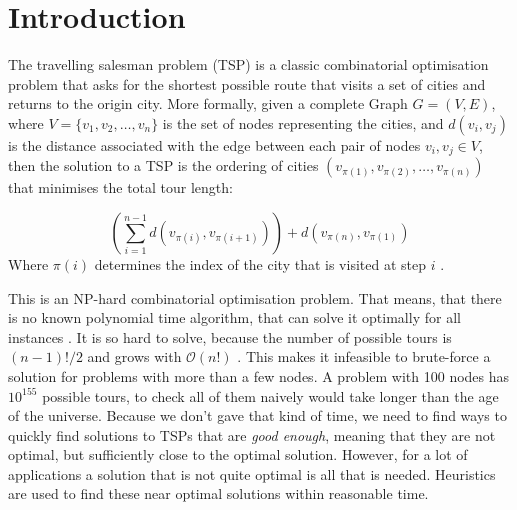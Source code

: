\section{Introduction}

The travelling salesman problem (TSP) is a classic combinatorial optimisation problem that asks for the shortest possible route that visits a set of cities and returns to the origin city.
More formally, given a complete Graph \( G=(V,E) \), where \( V = \{v_{1},v_{2},\ldots ,v_n\} \) is the set of nodes representing the cities,
and \( d(v_i,v_j) \) is the distance associated with the edge between each pair of nodes \( v_i,v_j \in V \), then
the solution to a TSP is the ordering of cities \( (v_{\pi(1)}, v_{\pi(2)}, \ldots  , v_{\pi(n)})\) that minimises the total tour length:

\begin{equation}
	\left( \sum_{i=1}^{n-1} d(v_{\pi(i)}, v_{\pi(i+1)}) \right) + d(v_{\pi(n)}, v_{\pi(1)})
	\label{eq:tsp-def}
\end{equation}
Where \( \pi (i) \) determines the index of the city that is visited at step \( i \) \cite{garey2002computers}.

This is an NP-hard combinatorial optimisation problem. That means, that there is no known polynomial time algorithm, that can solve it optimally for all instances \cite{garey2002computers}.
It is so hard to solve, because the number of possible tours is \( (n-1)!/2 \) and grows with \( \mathcal{O}(n!) \) \cite{garey2002computers}.
This makes it infeasible to brute-force a solution for problems with more than a few nodes. A problem with 100 nodes has \( 10^{155} \) possible tours,
to check all of them naively would take longer than the age of the universe.
Because we don't gave that kind of time, we need to find ways to quickly find solutions to TSPs that are \textit{good enough},
meaning that they are not optimal, but sufficiently close to the optimal solution.
However, for a lot of applications a solution that is not quite optimal is all that is needed.
Heuristics are used to find these near optimal solutions within reasonable time.
